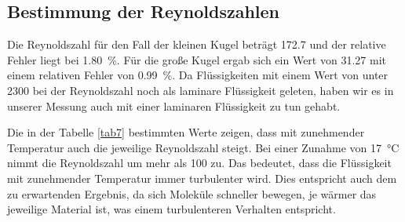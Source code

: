 \subsection{Bestimmung der Reynoldszahlen}
Die Reynoldszahl für den Fall der kleinen Kugel beträgt \num{172.7} und der relative Fehler liegt bei 
\SI{1.80}{\percent}. Für die große Kugel ergab sich ein Wert von \num{31.27} mit einem relativen Fehler von 
\SI{0.99}{\percent}. Da Flüssigkeiten mit einem Wert von unter \num{2300} bei der Reynoldszahl noch als laminare 
Flüssigkeit geleten, haben wir es in unserer Messung auch mit einer laminaren Flüssigkeit zu tun gehabt. 

\noindent Die in der Tabelle \ref{tab7} bestimmten Werte zeigen, dass mit zunehmender Temperatur auch die jeweilige 
Reynoldszahl steigt. Bei einer Zunahme von \SI{17}{\degreeCelsius} nimmt die Reynoldszahl um mehr als \num{100} zu. 
Das bedeutet, dass die Flüssigkeit mit zunehmender Temperatur immer turbulenter wird. Dies entspricht auch dem zu 
erwartenden Ergebnis, da sich Moleküle schneller bewegen, je wärmer das jeweilige Material ist, was einem 
turbulenteren Verhalten entspricht.